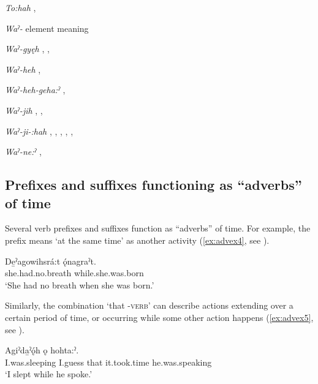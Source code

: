 \begin{CayugaRelated}
\item{}\textit{To:hah} , 

\item{}\textit{Waˀ-} element meaning 

\item{}\textit{Waˀ-gyęh} , , 

\item{}\textit{Waˀ-heh} , 

\item{}\textit{Waˀ-heh-geha:ˀ} , 

\item{}\textit{Waˀ-jih} , , 

\item{}\textit{Waˀ-ji-:hah} , , , , , 

\item{}\textit{Waˀ-ne:ˀ} , 

\end{CayugaRelated}


\subsection{Prefixes and suffixes functioning as “adverbs” of time}
Several verb prefixes and suffixes function as “adverbs” of time. For example, the  \textsc{\coincident} prefix means ‘at the same time’ as another activity (\ref{ex:advex4}, see ).

\ea\label{ex:advex4} 
 \gll De̱ˀagowihsrá:t ǫ́nagraˀt. \\
she.had.no.breath while.she.was.born\\
\glt ‘She had no breath when she was born.’
\z

Similarly, the combination  ‘that \textsc{\partitive}-\textsc{verb}’ can describe actions extending over a certain period of time, or occurring while some other action happens (\ref{ex:advex5}, see ).

\ea\label{ex:advex5} 
 \gll Agiˀda̱ˀǫ́h ǫ   hohta:ˀ. \\
I.was.sleeping I.guess that it.took.time he.was.speaking\\
\glt ‘I slept while he spoke.’
\z

